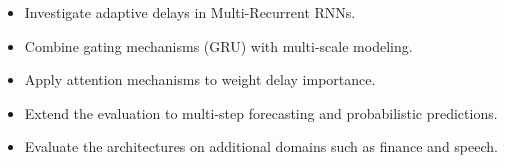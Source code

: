 \documentclass[conference]{IEEEtran}
\begin{document}
\begin{itemize}
    \item Investigate adaptive delays in Multi-Recurrent RNNs.
    \item Combine gating mechanisms (GRU) with multi-scale modeling.
    \item Apply attention mechanisms to weight delay importance.
    \item Extend the evaluation to multi-step forecasting and probabilistic predictions.
    \item Evaluate the architectures on additional domains such as finance and speech.
\end{itemize}

\end{document}
